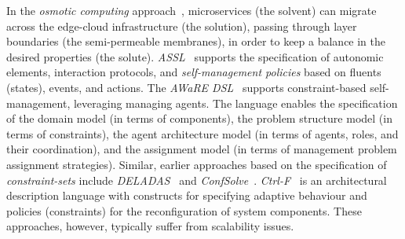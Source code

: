 \documentclass[conference]{IEEEtran}
\begin{document}
In the \emph{osmotic computing} approach~\cite{DBLP:journals/computer/VillariFDRJR19},
 microservices (the solvent)
 can migrate across 
 the edge-cloud infrastructure (the solution),
 passing through layer boundaries (the semi-permeable membranes),
 in order to keep a balance in the desired properties (the solute).
%
\emph{ASSL}~\cite{DBLP:conf/birthday/VassevH97}
 supports the specification
 of autonomic elements,
 interaction protocols,
 and \emph{self-management policies} based on fluents (states), events, and actions.
%
%
The \emph{AWaRE DSL}~\cite{DBLP:conf/aswec/ChhetriLUVKNR18/adsl} supports constraint-based self-management,
leveraging managing agents.
The language enables the specification of the domain model (in terms of components),
the problem structure model (in terms of constraints),
the agent architecture model (in terms of agents, roles, and their coordination), and the assignment model (in terms of management problem assignment strategies).
%
Similar, earlier approaches based on the specification of \emph{constraint-sets} include \emph{DELADAS}~\cite{Dearle2004deladas}
and \emph{ConfSolve}~\cite{DBLP:conf/saso/HewsonAG13}.
%
\emph{Ctrl-F}~\cite{DBLP:journals/jss/AlvaresRS17}
 is an architectural description language
 with constructs for specifying adaptive behaviour 
 and policies (constraints) for the reconfiguration of system components.
%
These approaches, however, typically suffer from scalability issues.

 
 
\end{document}
